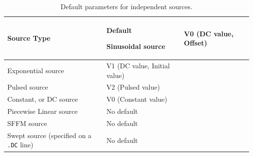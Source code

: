 


\small
\begin{longtable}[htbp]{|>{\setlength{\hsize}{.5\hsize}}Y|
>{\setlength{\hsize}{.5\hsize}}Y|} 
\caption[Default parameters for independent sources.]{Default parameters for independent sources.} \label{Step_Source_Defaults}
\\ \hline

\color{white}\textbf{Source Type} 
& \color{white}\bf Default \endhead


Sinusoidal source & V0 (DC value, Offset) \\ \hline

Exponential source & V1 (DC value, Initial value) \\ \hline

Pulsed source & V2 (Pulsed value) \\ \hline

Constant, or DC source & V0 (Constant value) \\ \hline

Piecewise Linear source & No default \\ \hline

SFFM source & No default \\ \hline

Swept source (specified on a \texttt{.DC} line) & No default \\ \hline
\end{longtable}


